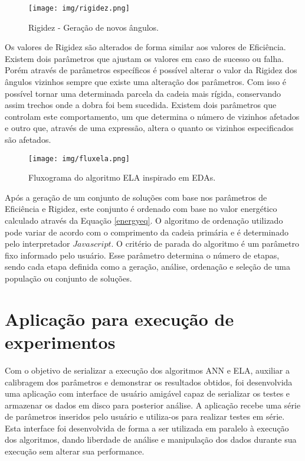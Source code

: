 \documentclass[dm,ppgcomp]{texfurg}
\begin{document}
\begin{figure}[htbp]
  \centering \texttt{[image: img/rigidez.png]}
\caption{Rigidez - Geração de novos ângulos.} 
\label{rigidez}
\end{figure}

Os valores de Rigidez são alterados de forma similar aos valores de Eficiência. Existem dois parâmetros que ajustam os valores em caso de sucesso ou falha. Porém através de parâmetros específicos é possível alterar o valor da Rigidez dos ângulos vizinhos sempre que existe uma alteração dos parâmetros. Com isso é possível tornar uma determinada parcela da cadeia mais rígida, conservando assim trechos onde a dobra foi bem sucedida. Existem dois parâmetros que controlam este comportamento, um que determina o número de vizinhos afetados e outro que, através de uma expressão, altera o quanto os vizinhos especificados são afetados. 

\begin{figure}[htbp]
  \centering \texttt{[image: img/fluxela.png]}
\caption{Fluxograma do algoritmo ELA inspirado em EDAs.} 
\label{fluxela}
\end{figure}

Após a geração de um conjunto de soluções com base nos parâmetros de Eficiência e Rigidez, este conjunto é ordenado com base no valor energético calculado através da Equação \ref{energyeq}. O algoritmo de ordenação utilizado pode variar de acordo com o comprimento da cadeia primária e é determinado pelo interpretador $Javascript$. O critério de parada do algoritmo é um parâmetro fixo informado pelo usuário. Esse parâmetro determina o número de etapas, sendo cada etapa definida como a geração, análise, ordenação e seleção de uma população ou conjunto de soluções.

\section{Aplicação para execução de experimentos}

Com o objetivo de serializar a execução dos algoritmos ANN e ELA, auxiliar a calibragem dos parâmetros e demonstrar os resultados obtidos, foi desenvolvida uma aplicação com interface de usuário amigável capaz de serializar os testes e armazenar os dados em disco para posterior análise. A aplicação recebe uma série de parâmetros inseridos pelo usuário e utiliza-os para realizar testes em série. Esta interface foi desenvolvida de forma a ser utilizada em paralelo à execução dos algoritmos, dando liberdade de análise e manipulação dos dados durante sua execução sem alterar sua performance.
\end{document}
